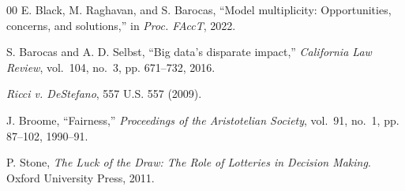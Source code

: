 \documentclass[conference]{IEEEtran}
\begin{document}
\begin{thebibliography}{00}
 E. Black, M. Raghavan, and S. Barocas, ``Model multiplicity: Opportunities,
concerns, and solutions,'' in \emph{Proc. FAccT}, 2022.

 S. Barocas and A. D. Selbst, ``Big data's disparate impact,''
\emph{California Law Review}, vol.~104, no.~3, pp. 671--732, 2016.

 \emph{Ricci v. DeStefano}, 557 U.S. 557 (2009).

 J. Broome, ``Fairness,'' \emph{Proceedings of the Aristotelian
Society}, vol.~91, no.~1, pp. 87--102, 1990--91.

 P. Stone, \emph{The Luck of the Draw: The Role of Lotteries in
Decision Making}. Oxford University Press, 2011.

\end{thebibliography}
\end{document}
